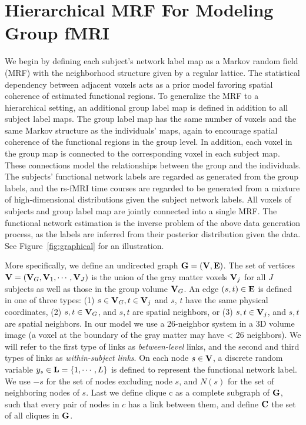 \documentclass[review,authoryear]{elsarticle}
\begin{document}
\section{Hierarchical MRF For Modeling Group fMRI}
\label{sec:model}
We begin by defining each subject's network label map as a Markov random field
(MRF) with the neighborhood structure given by a regular lattice. The
statistical dependency between adjacent voxels acts as a prior model favoring
spatial coherence of estimated functional regions. To generalize the MRF to a
hierarchical setting, an additional group label map is defined in addition to all
subject label maps. The group label map has the same number of voxels and the same
Markov structure as the individuals' maps, again to encourage spatial coherence of the
functional regions in the group level. In addition, each voxel in the group map
is connected to the corresponding voxel in each subject map. These connections model
the relationships between the group and the individuals. The subjects' functional network
labels are regarded as generated from the group labels, and
the rs-fMRI time courses are regarded to be generated from a mixture of
high-dimensional distributions given the subject network labels. All voxels of
subjects and group label map are jointly connected into a single MRF.  The functional
network estimation is the inverse problem of the above data generation process,
as the labels are inferred from their posterior distribution given the data. See
Figure~\ref{fig:graphical} for an illustration.

More specifically, we define an undirected graph $\text{\bf G} = (\text{\bf V}, \text{\bf E})$. The set of vertices $\text{\bf V} = (\text{\bf V}_G, \text{\bf V}_1, \cdots, \text{\bf V}_J)$ is
the union of the gray matter voxels $\text{\bf V}_j$ for all $J$ subjects as well as
those in the group volume $\text{\bf V}_G$.  An edge $(s, t) \in \text{\bf E}$ is defined in
one of three types: (1) $s\in \text{\bf V}_G, t\in \text{\bf V}_j$ and $s$, $t$ have the
same physical coordinates, (2) $s, t\in \text{\bf V}_G$, and $s, t$ are spatial
neighbors, or (3) $s, t\in \text{\bf V}_j$, and $s, t$ are spatial neighbors. In our
model we use a 26-neighbor system in a 3D volume image (a voxel at the boundary
of the gray matter may have < 26 neighbors). We will refer to the first type of
links as \emph{between-level} links, and the second and third types of links as
\emph{within-subject links}. On each node $s \in \text{\bf V}$, a discrete random
variable $y_s \in \text{\bf L} = \{1,\cdots, L\}$ is defined to represent the
functional network label. We use $-s$ for the set of nodes excluding node $s$,
and $N(s)$ for the set of neighboring nodes of $s$. Last we define clique c as a
complete subgraph of $\text{\bf G} $, such that every pair of nodes in $c$ has a
link between them, and define $\text{\bf C}$ the set of all cliques in $\text{\bf G}$.
\end{document}
